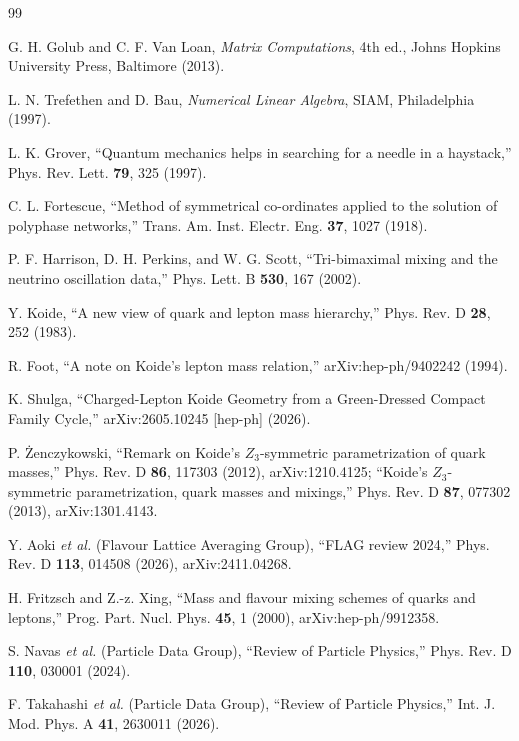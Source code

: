 \documentclass[aps,twocolumn,superscriptaddress,nofootinbib,floatfix]{revtex4-2}
\begin{document}
\begin{thebibliography}{99}

G. H. Golub and C. F. Van Loan, \textit{Matrix Computations}, 4th ed., Johns Hopkins University Press, Baltimore (2013).

L. N. Trefethen and D. Bau, \textit{Numerical Linear Algebra}, SIAM, Philadelphia (1997).

L. K. Grover, ``Quantum mechanics helps in searching for a needle in a haystack,'' Phys. Rev. Lett. \textbf{79}, 325 (1997).

C. L. Fortescue, ``Method of symmetrical co-ordinates applied to the solution of polyphase networks,'' Trans. Am. Inst. Electr. Eng. \textbf{37}, 1027 (1918).

P. F. Harrison, D. H. Perkins, and W. G. Scott, ``Tri-bimaximal mixing and the neutrino oscillation data,'' Phys. Lett. B \textbf{530}, 167 (2002).

Y. Koide, ``A new view of quark and lepton mass hierarchy,'' Phys. Rev. D \textbf{28}, 252 (1983).

R. Foot, ``A note on Koide's lepton mass relation,'' arXiv:hep-ph/9402242 (1994).

K. Shulga, ``Charged-Lepton Koide Geometry from a Green-Dressed Compact Family Cycle,'' arXiv:2605.10245 [hep-ph] (2026).



P. \.{Z}enczykowski, ``Remark on Koide's $Z_3$-symmetric parametrization of quark masses,'' Phys. Rev. D \textbf{86}, 117303 (2012), arXiv:1210.4125; ``Koide's $Z_3$-symmetric parametrization, quark masses and mixings,'' Phys. Rev. D \textbf{87}, 077302 (2013), arXiv:1301.4143.

Y. Aoki \textit{et al.} (Flavour Lattice Averaging Group), ``FLAG review 2024,'' Phys. Rev. D \textbf{113}, 014508 (2026), arXiv:2411.04268.

H. Fritzsch and Z.-z. Xing, ``Mass and flavour mixing schemes of quarks and leptons,'' Prog. Part. Nucl. Phys. \textbf{45}, 1 (2000), arXiv:hep-ph/9912358.

S. Navas \textit{et al.} (Particle Data Group), ``Review of Particle Physics,'' Phys. Rev. D \textbf{110}, 030001 (2024).

F. Takahashi \textit{et al.} (Particle Data Group), ``Review of Particle Physics,'' Int. J. Mod. Phys. A \textbf{41}, 2630011 (2026).


\end{thebibliography}
\end{document}
